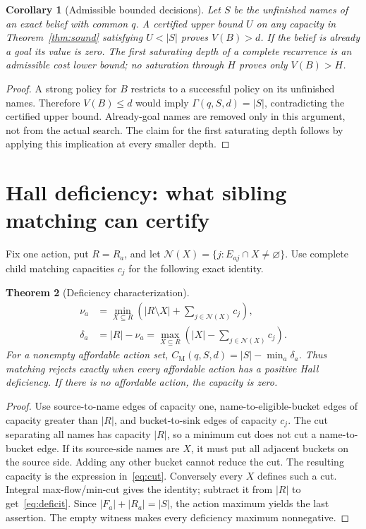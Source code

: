 \documentclass[11pt]{article}
\newtheorem{theorem}{Theorem}[section]
\newtheorem{corollary}[theorem]{Corollary}
\theoremstyle{definition}
\newcommand{\card}[1]{\lvert #1\rvert}
\newcommand{\CM}{C_{\mathrm M}}
\newcommand{\N}{\mathcal N}
\begin{document}
\begin{corollary}[Admissible bounded decisions]\label{cor:searchbound}
Let $S$ be the unfinished names of an exact belief with common $q$. A certified
upper bound $U$ on any capacity in Theorem~\ref{thm:sound} satisfying
$U<\card S$ proves $V(B)>d$. If the belief is already a goal its value is zero.
The first saturating depth of a complete recurrence is an admissible cost lower
bound; no saturation through $H$ proves only $V(B)>H$.
\end{corollary}
\begin{proof}
A strong policy for $B$ restricts to a successful policy on its unfinished
names. Therefore $V(B)\leq d$ would imply $\Gamma(q,S,d)=\card S$, contradicting
the certified upper bound. Already-goal names are removed only in this argument,
not from the actual search. The claim for the first saturating depth follows
by applying this implication at every smaller depth.
\end{proof}

\section{Hall deficiency: what sibling matching can certify}
Fix one action, put $R=R_a$, and let $\N(X)=\{j:E_{aj}\cap X\neq\varnothing\}$.
Use complete child matching capacities $c_j$ for the following exact identity.
\begin{theorem}[Deficiency characterization]\label{thm:hall}
\begin{align}
\nu_a&=\min_{X\subseteq R}\left(\card{R\setminus X}+
                                      \sum_{j\in\N(X)}c_j\right),\label{eq:cut}\\
\delta_a&=\card R-\nu_a
       =\max_{X\subseteq R}\left(\card X-\sum_{j\in\N(X)}c_j\right).\label{eq:deficit}
\end{align}
For a nonempty affordable action set,
$\CM(q,S,d)=\card S-\min_a\delta_a$.
Thus matching rejects exactly when every affordable action has a positive
Hall deficiency. If there is no affordable action, the capacity is zero.
\end{theorem}
\begin{proof}
Use source-to-name edges of capacity one, name-to-eligible-bucket edges of
capacity greater than $\card R$, and bucket-to-sink edges of capacity $c_j$.
The cut separating all names has capacity $\card R$, so a minimum cut does
not cut a name-to-bucket edge. If its source-side names are $X$, it must put
all adjacent buckets on the source side. Adding any other bucket cannot reduce
the cut. The resulting capacity is the expression in~\eqref{eq:cut}.
Conversely every $X$ defines such a cut. Integral max-flow/min-cut gives the
identity; subtract it from $\card R$ to get~\eqref{eq:deficit}. Since
$\card{F_a}+\card{R_a}=\card S$, the action maximum yields the last assertion.
The empty witness makes every deficiency maximum nonnegative.
\end{proof}
\end{document}
